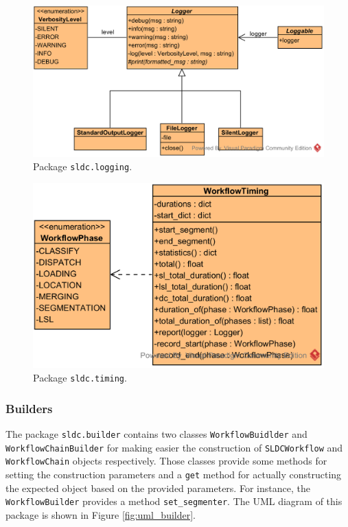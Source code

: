 \begin{figure}
	\center
	\includegraphics[scale=0.75]{image/uml_logging.png}
	\caption{Package \texttt{sldc.logging}.}
	\label{fig:uml_logging}
\end{figure}

\begin{figure}
	\center
	\includegraphics[scale=0.75]{image/uml_timing.png}
	\caption{Package \texttt{sldc.timing}.}
	\label{fig:uml_timing}
\end{figure}

\subsubsection{Builders}
The package \texttt{sldc.builder} contains two classes \texttt{WorkflowBuidlder} and \texttt{WorkflowChainBuilder} for making easier the construction of \texttt{SLDCWorkflow} and \texttt{WorkflowChain} objects respectively. Those classes provide some methods for setting the construction parameters and a \texttt{get} method for actually constructing the expected object based on the provided parameters. For instance, the \texttt{WorkflowBuilder} provides a method \texttt{set\_segmenter}. The UML diagram of this package is shown in Figure \ref{fig:uml_builder}.

